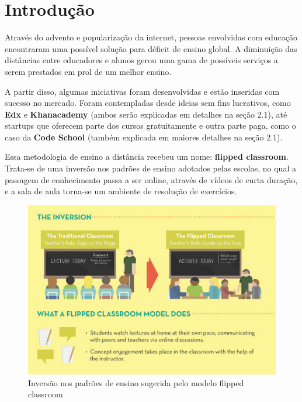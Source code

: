 \documentclass[graduacao,brazil]{ThesisPUC}
\begin{document}
\chapter{Introdu\c{c}\~{a}o}

Atrav\'{e}s do advento e populariza\c{c}\~{a}o da internet, pessoas envolvidas com educa\c{c}\~{a}o
encontraram uma poss\'{i}vel solu\c{c}\~{a}o para d\'{e}ficit de ensino global. A diminui\c{c}\~{a}o
das dist\^{a}ncias entre educadores e alunos gerou uma gama de poss\'{i}veis servi\c{c}os a serem prestados
em prol de um melhor ensino.

A partir disso, algumas iniciativas foram desenvolvidas e est\~{a}o inseridas com sucesso no
mercado. Foram contempladas desde ideias sem fins lucrativos, como \textbf{Edx} e \textbf{Khanacademy}
(ambos serão explicadas em detalhes na seção 2.1), at\'{e} startups que oferecem parte dos cursos
gratuitamente e outra parte paga, como o caso da \textbf{Code School} (tamb\'{e}m explicada em maiores
detalhes na seção 2.1).

Essa metodologia de ensino a dist\^{a}ncia recebeu um nome: \textbf{flipped classroom}. Trata-se de
uma invers\~{a}o nos padr\~{o}es de ensino adotados pelas escolas, no qual a passagem de
conhecimento passa a ser online, atrav\'{e}s de v\'{i}deos de curta dura\c{c}\~{a}o, e a sala de aula torna-se
um ambiente de resolu\c{c}\~{a}o de exerc\'{i}cios.

\begin{figure}[H]
    \centering
    \includegraphics[width=\linewidth]{Imagens/flipped_classroom.png}
    \caption{Inversão nos padrões de ensino sugerida pelo modelo flipped classroom}
\end{figure}
\end{document}
